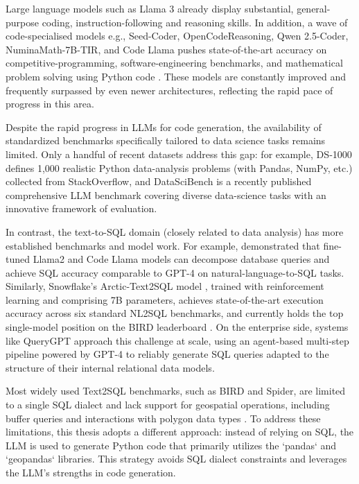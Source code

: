 Large language models such as Llama 3 \citep{Grattafiori2024Llama3} already display substantial, general-purpose coding, instruction-following and reasoning skills. In addition, a wave of code-specialised models e.g., Seed-Coder, OpenCodeReasoning, Qwen 2.5-Coder, NuminaMath-7B-TIR, and Code Llama pushes state-of-the-art accuracy on competitive-programming, software-engineering benchmarks, and mathematical problem solving using Python code \citep{Seed2025SeedCoder, Ahmad2025OCRNVidia, Hui2024Qwen25Coder, Roziere2024CodeLlama, Moshkov2025AIMO2, Yin2024MuMathCode, Gou2024ToRA}. These models are constantly improved and frequently surpassed by even newer architectures, reflecting the rapid pace of progress in this area.

Despite the rapid progress in LLMs for code generation, the availability of standardized benchmarks specifically tailored to data science tasks remains limited. Only a handful of recent datasets address this gap: for example, DS‑1000 \citep{Lai2022DS1000} defines 1,000 realistic Python data-analysis problems (with Pandas, NumPy, etc.) collected from StackOverflow, and DataSciBench \citep{Zhang2025DataSciBench} is a recently published comprehensive LLM benchmark covering diverse data-science tasks with an innovative framework of evaluation.

In contrast, the text-to-SQL domain (closely related to data analysis) has more established benchmarks and model work. For example, \cite{Dominguez2024BlarSQL} demonstrated that fine-tuned Llama2 and Code Llama models can decompose database queries and achieve SQL accuracy comparable to GPT-4 on natural-language-to-SQL tasks. Similarly, Snowflake's Arctic-Text2SQL model \citep{Yao2025ArcticText2SQLR1}, trained with reinforcement learning and comprising 7B parameters, achieves state-of-the-art execution accuracy across six standard NL2SQL benchmarks, and currently holds the top single-model position on the BIRD leaderboard \citep{Li2023BirdSQL}. On the enterprise side, systems like QueryGPT \citep{Uber2024QueryGPT} approach this challenge at scale, using an agent-based multi-step pipeline powered by GPT-4 to reliably generate SQL queries adapted to the structure of their internal relational data models.


Most widely used Text2SQL benchmarks, such as BIRD and Spider, are limited to a single SQL dialect and lack support for geospatial operations, including buffer queries and interactions with polygon data types \citep{Li2023BirdSQL, Yu2019Spider}. To address these limitations, this thesis adopts a different approach: instead of relying on SQL, the LLM is used to generate Python code that primarily utilizes the `pandas` and `geopandas` libraries. This strategy avoids SQL dialect constraints and leverages the LLM's strengths in code generation.

